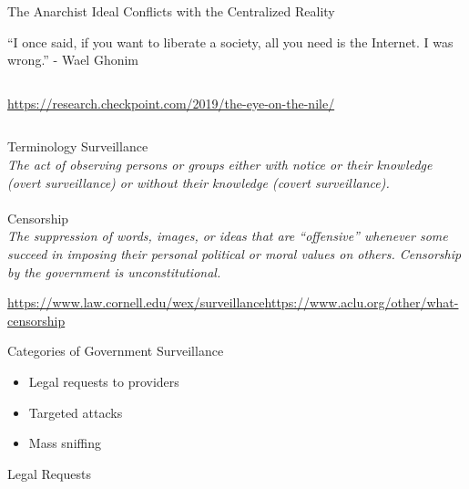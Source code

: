 \documentclass[nobackground,dvipsnames,table]{beamer}
\begin{document}
\begin{frame}{The Anarchist Ideal Conflicts with the Centralized Reality}
\end{frame}

\begin{frame}{“I once said, if you want to liberate a society, all you need is the Internet. I was wrong.” - Wael Ghonim}
    \begin{columns}
            \href{Check Point Research}{https://research.checkpoint.com/2019/the-eye-on-the-nile/}
    \end{columns}
\end{frame}

\begin{frame}{Terminology}%
    \Large{Surveillance}\\
    \textit{The act of observing persons or groups either with notice or their knowledge (overt surveillance) or without their knowledge (covert surveillance).}\\~\\
    
    \Large{Censorship}\\
    \textit{The suppression of words, images, or ideas that are “offensive” whenever some succeed in imposing their personal political or moral values on others. Censorship by the government is unconstitutional.}

    \scriptsize
    \href{Cornell Law, }{https://www.law.cornell.edu/wex/surveillance}\href{ACLU}{https://www.aclu.org/other/what-censorship}
\end{frame}

\begin{frame}{Categories of Government Surveillance}
    \begin{itemize}
        \item Legal requests to providers
        \item Targeted attacks
        \item Mass sniffing
    \end{itemize}
\end{frame}

\begin{frame}{}%
    Legal Requests
\end{frame}

\begin{frame}{}
    \thispagestyle{empty}
\end{frame}
\end{document}
